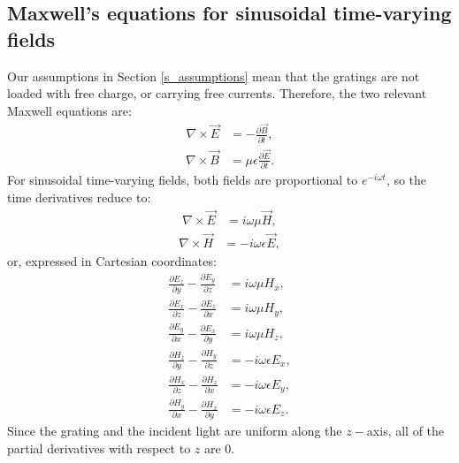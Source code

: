 \subsection{Maxwell's equations for sinusoidal time-varying fields}
Our assumptions in Section \ref{s_assumptions} mean that the gratings are not loaded with free charge, or carrying free currents. Therefore, the two relevant Maxwell equations are:
\begin{align}
\nabla \times \vec E &= - \frac {\partial \vec B }{\partial t},
\end{align}
\begin{align}
\nabla \times \vec B &= \mu \epsilon \frac{ \partial \vec E }{ \partial t }.
\end{align}
For sinusoidal time-varying fields, both fields are proportional to $e^{-i \omega t}$, so the time derivatives reduce to:
\begin{align}
\nabla \times \vec E &= i \omega \mu \vec H,
\end{align}
\begin{align}
\nabla \times \vec H &= - i \omega \epsilon \vec E,
\end{align}
or, expressed in Cartesian coordinates:
\begin{align}
\label{maxwellEqn1}
\frac{\partial E_z}{\partial y} - \frac{\partial E_y}{\partial z} &= i \omega \mu H_x,  \\
\label{maxwellEqn2}
\frac{\partial E_x}{\partial z} - \frac{\partial E_z}{\partial x} &= i \omega \mu H_y,  \\
\label{maxwellEqn3}
\frac{\partial E_y}{\partial x} - \frac{\partial E_x}{\partial y} &= i \omega \mu H_z,  \\
\label{maxwellEqn4}
\frac{\partial H_z}{\partial y} - \frac{\partial H_y}{\partial z} &= -i \omega \epsilon E_x,  \\
\label{maxwellEqn5}
\frac{\partial H_x}{\partial z} - \frac{\partial H_z}{\partial x} &= -i \omega \epsilon E_y, \\
\label{maxwellEqn6}
\frac{\partial H_y}{\partial x} - \frac{\partial H_x}{\partial y} &= -i \omega \epsilon E_z.
\end{align}
Since the grating and the incident light are uniform along the $z-$axis, all of the partial derivatives with respect to $z$ are 0.

